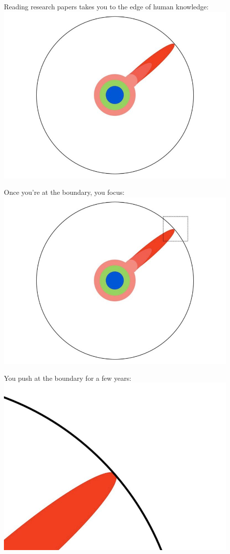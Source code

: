 \documentclass{beamer}
\begin{document}
\begin{frame}
	Reading research papers takes you to the edge of human knowledge:
	\center\includegraphics[width=0.9\textwidth]{figures/fig_6}
\end{frame}

\begin{frame}
	Once you're at the boundary, you focus:
	\center\includegraphics[width=0.9\textwidth]{figures/fig_7}
\end{frame}

\begin{frame}
	You push at the boundary for a few years:
	\center\includegraphics[width=0.9\textwidth]{figures/fig_8}
\end{frame}
\end{document}
